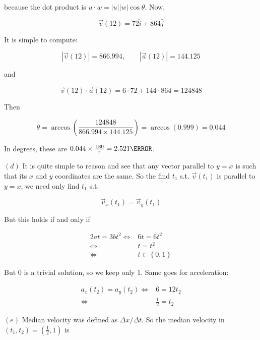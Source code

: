 \documentclass[12pt]{article}
\theoremstyle{definition}
\begin{document}
because the dot product is $u \cdot w = \left| u \right| \left| w \right| \cos
\theta $. Now, 

\begin{equation*}
    \vec{v}(12) = 72\hat{i} + 864\hat{j}
\end{equation*}

It is simple to compute: 

\begin{equation*}
    \left| \vec{v}(12) \right| = 866.994, \qquad \left| \vec{a}(12) \right|  =
    144.125
\end{equation*}

and 

\begin{equation*}
    \vec{v}(12) \cdot \vec{a}(12) = 6 \cdot 72 + 144 \cdot 864 = 124848
\end{equation*}

Then 

\begin{equation*}
    \theta = \arccos \left( \frac{124848}{866.994 \times 144.125} \right) =
    \arccos (0.999) = 0.044
\end{equation*}

In degrees, these are $0.044 \times \frac{180}{\pi} = 2.521\degree$.

$(d)$ It is quite simple to reason and see that any vector parallel  to $y = x$
is such that its $x$ and $y$ coordinates are the same. So the find $t_1$ s.t. 
$\vec{v}(t_1)$ is parallel to $y = x$, we need only find $t_1$ s.t. 

\begin{equation*}
    \vec{v}_x(t_1) = \vec{v}_y(t_1)
\end{equation*}

But this holds if and only if 

\begin{align*}
    2at = 3bt^2 
    \iff& 6t = 6t^2\\ 
    \iff&t = t^2 \\ 
    \iff&t \in \left\{ 0, 1 \right\} 
\end{align*}

But $0$ is a trivial solution, so we keep only $1$. Same goes for acceleration:

\begin{align*}
    a_x(t_2) = a_y(t_2) 
    \iff& 6 = 12t_2 \\ 
    \iff& \frac{1}{2} = t_2
\end{align*}

$(e)$ Median velocity was defined as $\Delta x / \Delta t$. So the median
velocity in $(t_1, t_2) = (\frac{1}{2}, 1)$ is 
\end{document}
